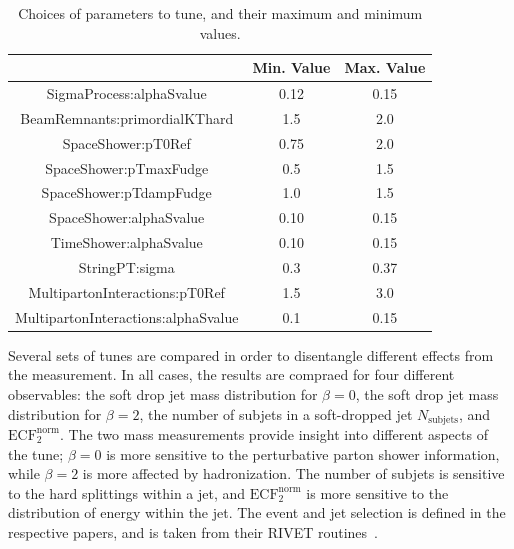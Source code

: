 \begin{table}[ht!]
\caption{Choices of parameters to tune, and their maximum and minimum values.}
\centering\begin{tabular}{ | c | | c | c | } \hline
                                     & Min. Value   & Max. Value    \\ \hline
SigmaProcess:alphaSvalue             &  0.12        & 0.15    \\ \hline
BeamRemnants:primordialKThard        &  1.5         & 2.0     \\ \hline
SpaceShower:pT0Ref                   &  0.75        & 2.0     \\ \hline
SpaceShower:pTmaxFudge               &  0.5         & 1.5     \\ \hline
SpaceShower:pTdampFudge              &  1.0         & 1.5     \\ \hline
SpaceShower:alphaSvalue              &  0.10        & 0.15    \\ \hline
TimeShower:alphaSvalue               &  0.10        & 0.15    \\ \hline
StringPT:sigma                       &  0.3         & 0.37    \\ \hline
MultipartonInteractions:pT0Ref       &  1.5         & 3.0     \\ \hline
MultipartonInteractions:alphaSvalue  &  0.1         & 0.15    \\ \hline
\end{tabular}
\label{tab:parameterSpace}
\end{table}

Several sets of tunes are compared in order to disentangle different effects from the measurement. In all cases, the results are compraed for four different observables:
the soft drop jet mass distribution for $\beta=0$, the soft drop jet mass distribution for $\beta=2$, the number of subjets in a soft-dropped jet $N_{\mathrm{subjets}}$, and $\mathrm{ECF}_2^{\mathrm{norm}}$.
The two mass measurements provide insight into different aspects of the tune; $\beta=0$ is more sensitive to the perturbative parton shower information, 
while $\beta=2$ is more affected by hadronization. The number of subjets is sensitive to the hard splittings within a jet, and $\mathrm{ECF}_2^{\mathrm{norm}}$ is more sensitive to the 
distribution of energy within the jet. The event and jet selection is defined in the respective papers, and is taken from their RIVET routines~\cite{rivet}.

